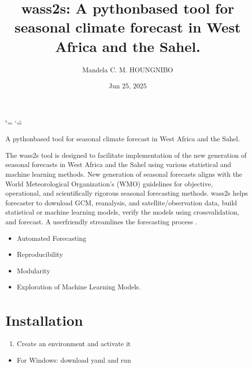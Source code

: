 \documentclass[letterpaper,10pt,english]{sphinxmanual}
\title{wass2s: A python\sphinxhyphen{}based tool for seasonal climate forecast in West Africa and the Sahel.\@{}}
\date{Jun 25, 2025}
\author{Mandela C.\@{} M.\@{} HOUNGNIBO}
\begin{document}
\ifdefined\shorthandoff
  \ifnum\catcode`\=\string=\active\shorthandoff{=}\fi
  \ifnum\catcode`\"=\active{}\fi
\fi

\pagestyle{empty}
\sphinxmaketitle
\pagestyle{plain}
\sphinxtableofcontents
\pagestyle{normal}
\label{\detokenize{index::doc}}


\sphinxAtStartPar
A python\sphinxhyphen{}based tool for seasonal climate forecast in West Africa and the Sahel.

\sphinxAtStartPar
The wass2s tool is designed to facilitate implementation of the new generation of seasonal forecasts in West Africa and the Sahel using various statistical and machine learning methods. New generation of seasonal forecasts aligns with the World Meteorological Organization’s (WMO) guidelines for objective, operational, and scientifically rigorous seasonal forecasting methods. wass2s helps forecaster to download GCM, reanalysis, and satellite/observation data, build statistical or machine learning models, verify the models using cross\sphinxhyphen{}validation, and forecast.
A user\sphinxhyphen{}friendly   streamlines the forecasting process .

\sphinxAtStartPar
{}
\begin{itemize}
\item {} 
\sphinxAtStartPar
Automated Forecasting

\item {} 
\sphinxAtStartPar
Reproducibility

\item {} 
\sphinxAtStartPar
Modularity

\item {} 
\sphinxAtStartPar
Exploration of Machine Learning Models.

\end{itemize}

\sphinxstepscope


\chapter{Installation}
\label{\detokenize{Installation:installation}}\label{\detokenize{Installation::doc}}\begin{enumerate}
%
\item {} 
\sphinxAtStartPar
Create an environment and activate it

\end{enumerate}
\begin{itemize}
\item {} 
\sphinxAtStartPar
For Windows: download yaml  and run

\end{itemize}
\end{document}

